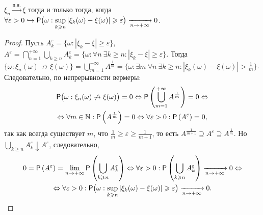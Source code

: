  \begin{lemma}
 	$\xi_n \xrightarrow{\text{п.н.}} \xi$ тогда и только тогда, когда $\forall \varepsilon > 0 \hookrightarrow \mathsf{P} \big(\omega: \sup\limits_{k \geqslant n} | \xi_k(\omega) - \xi(\omega) | \geqslant \varepsilon \big) \xrightarrow[n \rightarrow + \infty]{} 0$.
 	\begin{proof}
 		Пусть $A_k^\varepsilon = 
 		\big\{ \omega: | \xi_k - \xi | \geqslant \varepsilon \big\}$, $A^\varepsilon = 
 		\bigcap\limits_{n=1}^{+\infty} \bigcup\limits_{k \geqslant n} A_k^\varepsilon = 
 		\big\{\omega: \forall n~ \exists k \geqslant n: |\xi_k - \xi| \geqslant \varepsilon \big\}$. 
 		Тогда $\big\{ \omega: \xi_n (\omega) \not\rightarrow \xi(\omega) \big\} = 
 		\bigcup\limits_{m=1}^{+\infty} A^{\frac{1}{m}} = 
 		\big\{\omega: \exists m~ \forall n~ \exists k \geqslant n: | \xi_k(\omega) - \xi(\omega) | > \frac{1}{m} \big\}$. Следовательно, по непрерывности вермеры: 
 		\begin{multline*}
 			\mathsf{P} \big( \omega: \xi_n(\omega) \not\rightarrow \xi(\omega) \big) = 0 \Leftrightarrow \mathsf{P} \left( \bigcup\limits_{m = 1}^{+\infty} A^{\frac{1}{m}} \right) = 0 \Leftrightarrow \\ \Leftrightarrow \forall m \in \mathbb{N} : \mathsf{P} \left( A^{\frac{1}{m}} \right) = 0  \Leftrightarrow \forall \varepsilon > 0 : \mathsf{P}  \left( A^\varepsilon \right) = 0,
 		\end{multline*}
 		так как всегда существует $m$, что $\frac{1}{m} \geqslant \varepsilon \geqslant \frac{1}{m+1}$, то есть $A^{\frac{1}{m+1}} \supseteq A^\varepsilon \supseteq A^{\frac{1}{m}}$. Но $\bigcup\limits_{k \geqslant n} A^\varepsilon_k \downarrow A^\varepsilon$, следовательно, 
 		\begin{multline*}
 			0 = \mathsf{P} \left( A^\varepsilon \right) = 
 			\lim\limits_{n \rightarrow + \infty} \mathsf{P} \left( \bigcup_{k \geqslant n} A^\varepsilon_k \right) \Leftrightarrow
 			\forall \varepsilon > 0 : \mathsf{P} \left( \bigcup\limits_{k \geqslant n} A^\varepsilon_k \right) \xrightarrow[n \rightarrow + \infty]{} 0 \Leftrightarrow \\ 
 			\Leftrightarrow  \forall \varepsilon > 0:  \mathsf{P} \big(\omega: \sup\limits_{k \geqslant n} | \xi_k(\omega) - \xi(\omega) | \geqslant \varepsilon \big) \xrightarrow[n \rightarrow + \infty]{} 0.
 		\end{multline*}
 	\end{proof}
 \end{lemma}
